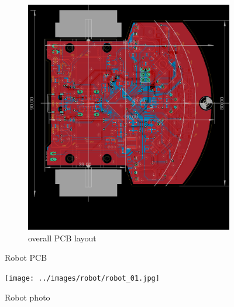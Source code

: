 \documentclass[12pt,twoside,onecolumn,openany,extrafontsizes,dvipsnames]{memoir}
\begin{document}
\begin{figure}[h]
\begin{subfigure}{.5\textwidth}
            \includegraphics[scale=0.35]{../images/robot/board_all.png}
            \caption{overall PCB layout}
            \label{fig:overall_PCB_layout}
        \end{subfigure}


        \caption{Robot PCB}
    \end{figure}

    \begin{figure}[!b]
        \centering
        \texttt{[image: ../images/robot/robot\_01.jpg]}
        \caption{Robot photo}
        \label{fig:robot_photo}
    \end{figure}
\end{document}
